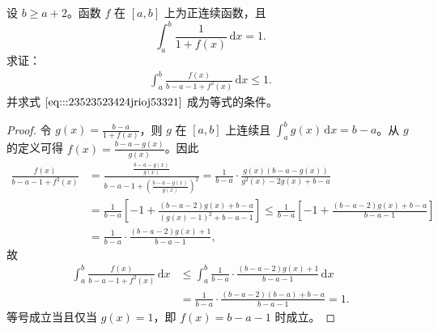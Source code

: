 \documentclass[../../main.tex]{subfiles}
\begin{document}
\begin{example}
设 \( b \geqslant a + 2 \)。函数 \( f \) 在 \([a,b]\) 上为正连续函数，且
\[
\int_{a}^{b} \frac{1}{1 + f(x)} \, \mathrm{d}x = 1.
\]
求证：
\begin{align}
\int_{a}^{b} \frac{f(x)}{b - a - 1 + f^2(x)} \, \mathrm{d}x \leqslant 1. \label{eq:::23523523424jrioj53321}
\end{align}
并求式 \(\eqref{eq:::23523523424jrioj53321}\) 成为等式的条件。
\end{example}
\begin{proof}
令 \( g(x) = \frac{b - a}{1 + f(x)} \)，则 \( g \) 在 \([a,b]\) 上连续且 \( \int_{a}^{b} g(x) \, \mathrm{d}x = b - a \)。从 \( g \) 的定义可得 \( f(x) = \frac{b - a - g(x)}{g(x)} \)。因此
\begin{align*}
\frac{f(x)}{b-a-1+f^2(x)}&=\frac{\frac{b-a-g(x)}{g(x)}}{b-a-1+\left( \frac{b-a-g(x)}{g(x)} \right) ^2}=\frac{1}{b-a}\cdot \frac{g(x)(b-a-g(x))}{g^2(x)-2g(x)+b-a}
\\
&=\frac{1}{b-a}\left[ -1+\frac{(b-a-2)g(x)+b-a}{(g(x)-1)^2+b-a-1} \right] \leqslant \frac{1}{b-a}\left[ -1+\frac{(b-a-2)g(x)+b-a}{b-a-1} \right] 
\\
&=\frac{1}{b-a}\cdot \frac{(b-a-2)g(x)+1}{b-a-1},
\end{align*}
故
\begin{align*}
\int_a^b{\frac{f(x)}{b-a-1+f^2(x)}\,\mathrm{d}x}&\leqslant \int_a^b{\frac{1}{b-a}}\cdot \frac{(b-a-2)g(x)+1}{b-a-1}\,\mathrm{d}x
\\
&=\frac{1}{b-a}\cdot \frac{(b-a-2)(b-a)+b-a}{b-a-1}=1.
\end{align*}
等号成立当且仅当 \( g(x) = 1 \)，即 \( f(x) = b - a - 1 \) 时成立。

\end{proof}
\end{document}
